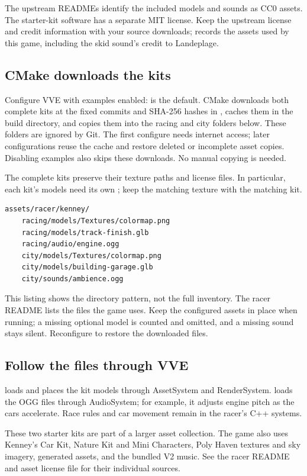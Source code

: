\documentclass[11pt,a4paper]{article}
\begin{document}
The upstream READMEs identify the included models and sounds as CC0 assets. The starter-kit software has a separate MIT license. Keep the upstream license and credit information with your source downloads;  records the assets used by this game, including the skid sound's credit to Landeplage.

\subsection*{CMake downloads the kits}
Configure VVE with examples enabled:  is the default. CMake downloads both complete kits at the fixed commits and SHA-256 hashes in , caches them in the build directory, and copies them into the racing and city folders below. These folders are ignored by Git. The first configure needs internet access; later configurations reuse the cache and restore deleted or incomplete asset copies. Disabling examples also skips these downloads. No manual copying is needed.

The complete kits preserve their texture paths and license files. In particular, each kit's models need its own ; keep the matching texture with the matching kit.

\begin{lstlisting}[language={}]
assets/racer/kenney/
    racing/models/Textures/colormap.png
    racing/models/track-finish.glb
    racing/audio/engine.ogg
    city/models/Textures/colormap.png
    city/models/building-garage.glb
    city/sounds/ambience.ogg
\end{lstlisting}
This listing shows the directory pattern, not the full inventory. The racer README lists the files the game uses. Keep the configured assets in place when running; a missing optional model is counted and omitted, and a missing sound stays silent. Reconfigure to restore the downloaded files.

\subsection*{Follow the files through VVE}
 loads and places the kit models through AssetSystem and RenderSystem.  loads the OGG files through AudioSystem; for example, it adjusts engine pitch as the cars accelerate. Race rules and car movement remain in the racer's C++ systems.

These two starter kits are part of a larger asset collection. The game also uses Kenney's Car Kit, Nature Kit and Mini Characters, Poly Haven textures and sky imagery, generated assets, and the bundled V2 music. See the racer README and asset license file for their individual sources.
\end{document}
